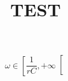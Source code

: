 \documentclass[a4paper]{article}
\title{
    \vspace{-1.5cm}
    TEST
    \vspace{-2.0cm}
  }
\date{}
\author{}
\begin{document}
\maketitle
\[
  \omega \in \left[ \frac{1}{rC}, + \infty \right[
\]
\end{document}
